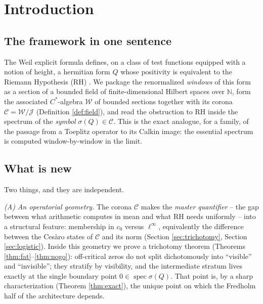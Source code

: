 \documentclass[11pt,reqno]{amsart}
\theoremstyle{definition}
\newcommand{\W}{\mathcal{W}}
\newcommand{\Jc}{\mathcal{J}}
\newcommand{\Cor}{\mathcal{C}}
\newcommand{\spec}{\operatorname{spec}}
\newcommand{\N}{\mathbb{N}}
\begin{document}
\maketitle

\tableofcontents
\newpage

\section{Introduction}\label{sec:intro}

\subsection{The framework in one sentence}
The Weil explicit formula defines, on a class of test functions equipped with a
notion of height, a hermitian form \(Q\) whose positivity is equivalent to the
Riemann Hypothesis (RH) \cite{Weil1952}. We package the renormalized
\emph{windows} of this form as a section of a bounded field of
finite-dimensional Hilbert spaces over \(\N\), form the associated
\(C^*\)-algebra \(\W\) of
bounded sections together with its corona \(\Cor=\W/\Jc\) (Definition
\ref{def:field}), and read the obstruction to RH inside the spectrum of the
\emph{symbol} \(\sigma(Q)\in\Cor\). This is the exact analogue, for a family,
of the passage from a Toeplitz operator to its Calkin image: the essential
spectrum is computed window-by-window in the limit.

\subsection{What is new}
Two things, and they are independent.

\emph{(A) An operatorial geometry.} The corona \(\Cor\) makes the
\emph{master quantifier} -- the gap between what arithmetic computes in mean and
what RH needs uniformly -- into a structural feature: membership in \(c_0\)
versus \(\ell^\infty\), equivalently the difference between the Ces\`aro states
of \(\Cor\) and its norm (Section \ref{sec:trichotomy}, Section
\ref{sec:logistic}). Inside this geometry we prove a trichotomy theorem
(Theorems \ref{thm:fat}--\ref{thm:nogo}): off-critical zeros do not split
dichotomously into ``visible'' and ``invisible''; they stratify by visibility,
and the intermediate stratum lives exactly at the single boundary point
\(0\in\spec\sigma(Q)\). That point is, by a sharp characterization (Theorem
\ref{thm:exact}), the unique point on which the Fredholm half of the architecture
depends.
\end{document}
